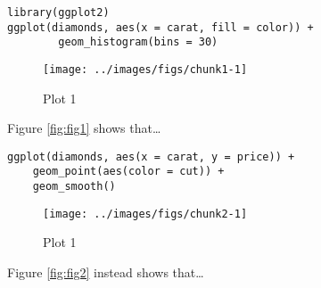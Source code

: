 \begin{verbatim}
library(ggplot2)
ggplot(diamonds, aes(x = carat, fill = color)) +
        geom_histogram(bins = 30)
\end{verbatim}

\begin{figure}[H]

{\centering \texttt{[image: ../images/figs/chunk1-1]} 

}

\caption{\label{fig:fig1}Plot 1}\label{fig:chunk1}
\end{figure}

Figure \ref{fig:fig1} shows that\ldots{}

\pagebreak

\begin{verbatim}
ggplot(diamonds, aes(x = carat, y = price)) +
    geom_point(aes(color = cut)) +
    geom_smooth()
\end{verbatim}

\begin{figure}[H]

{\centering \texttt{[image: ../images/figs/chunk2-1]} 

}

\caption{\label{fig:fig2}Plot 1}\label{fig:chunk2}
\end{figure}

Figure \ref{fig:fig2} instead shows that\ldots{}
